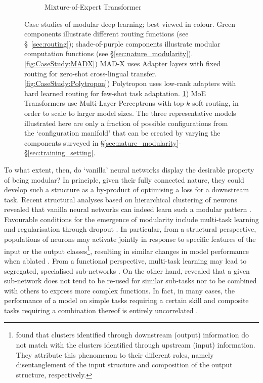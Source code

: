 \documentclass[10pt]{article} %
\begin{document}
\begin{figure}[t]
\begin{subfigure}[b]{.35\linewidth}
        \caption{Mixture-of-Expert Transformer}
        \label{fig:CaseStudy:MoE}
    \end{subfigure} 
    \caption{ Case studies of modular deep learning; best viewed in colour. Green components illustrate different routing functions (see \S~\ref{sec:routing}); shade-of-purple components illustrate modular computation functions (see \S \ref{sec:nature_modularity}). \ref{fig:CaseStudy:MADX}) MAD-X \protect\citep{pfeiffer-etal-2020-mad} uses Adapter layers with fixed routing for zero-shot cross-lingual transfer. \ref{fig:CaseStudy:Polytropon}) Polytropon \protect\citep{ponti2022combining} uses low-rank adapters \citep[LoRA;][]{hu2021lora} with hard learned routing for few-shot task adaptation. \ref{fig:CaseStudy:MoE}) MoE Transformers \citep[\textit{inter alia}]{fedus2021switch,Clark2022UnifiedScaling} use Multi-Layer Perceptrons with top-$k$ soft routing, in order to scale to larger model sizes. The three representative models illustrated here are only a fraction of possible configurations from the `configuration manifold' that can be created by varying the components surveyed in \S\ref{sec:nature_modularity}-\S\ref{sec:training_setting}.
    }
\label{fig:CaseStudy}
\end{figure}

To what extent, then, do `vanilla' neural networks display the desirable property of being modular? In principle, given their fully connected nature, they could develop such a structure as a by-product of optimising a loss for a downstream task. Recent structural analyses based on hierarchical clustering of neurons revealed that vanilla neural networks can indeed learn such a modular pattern \citep{watanabe2019interpreting,casper2022graphical,Foroutan2022Discovering}. Favourable conditions for the emergence of modularity include multi-task learning \citep{dobs2022brain} and regularisation through dropout \citep{lange2022clustering}. In particular, from a structural perspective, populations of neurons may activate jointly in response to specific features of the input or the output classes\footnote{\citet{lange2022clustering} found that clusters identified through downstream (output) information do not match with the clusters identified through upstream (input) information. They attribute this phenomenon to their different roles, namely disentanglement of the input structure and composition of the output structure, respectively.}, resulting in similar changes in model performance when ablated \citep{meyes2020under}.
From a functional perspective, multi-task learning may lead to segregated, specialised sub-networks \citep{yang2019task,dobs2022brain}.
On the other hand, \citet{csordas2021are} revealed that a given sub-network does not tend to be re-used for similar sub-tasks nor to be combined with others to express more complex functions. In fact, in many cases, the performance of a model on simple tasks requiring a certain skill and composite tasks requiring a combination thereof is entirely uncorrelated \citep{li-etal-2022-quantifying}. 
\end{document}
